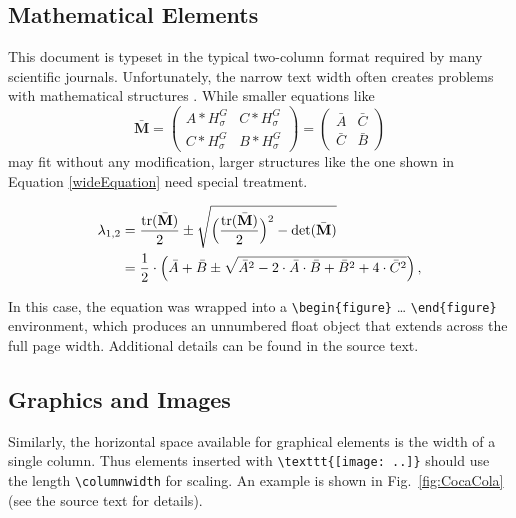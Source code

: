 \documentclass[english,twocolumn,smartquotes]{hgbarticle}
\begin{document}
\subsection{Mathematical Elements}

This document is typeset in the typical two-column format required by many
scientific journals. Unfortunately, the narrow text width often creates
problems with mathematical structures \cite{Voss2014}. While smaller
equations like
%
\begin{equation}
\bar{\mathbf{M}} =  
\begin{pmatrix}
	A \ast H^{G}_{\sigma}   & C \ast H^{G}_{\sigma} \\
	C \ast H^{G}_{\sigma}   & B \ast H^{G}_{\sigma} 
\end{pmatrix}
=
\begin{pmatrix}
	\bar{A}   & \bar{C} \\
	\bar{C}   & \bar{B} 
\end{pmatrix}
\end{equation}
%
may fit without any modification, larger structures like the one shown in
Equation \ref{wideEquation} need special treatment.
%
\begin{figure}[t]
	\begin{equation}
		\begin{split}
			\lambda_{1,2}
			&= \frac{\mathrm{tr}(\bar{\mathbf{M}})}{2} \pm \sqrt{\Bigl
			(\frac{\mathrm{tr}(\bar{\mathbf{M}})}{2}\Bigr)^2
			- \mathrm{det}(\bar{\mathbf{M}})}  \\
			&= \frac{1}{2} \cdot \left( \bar{A} + \bar{B} \pm \sqrt{\bar{A}^2 -
			2 \cdot \bar{A} \cdot \bar{B} + \bar{B}^2 + 4 \cdot \bar{C}^2}
			\right)
			,
		\end{split}
		\label{wideEquation}
	\end{equation}
\end{figure}
%
In this case, the equation was wrapped into a \verb!\begin{figure}! \ldots
\verb!\end{figure}! environment, which produces an unnumbered float object
that extends across the full page width. Additional details can be found in
the source text.

\subsection{Graphics and Images}

Similarly, the horizontal space available for graphical elements is the width
of a single column. Thus elements inserted with \verb!\texttt{[image: ..]}! 
should use the length \verb!\columnwidth! for scaling. An example is shown in
Fig.~\ref{fig:CocaCola} (see the source text for details).
\end{document}
